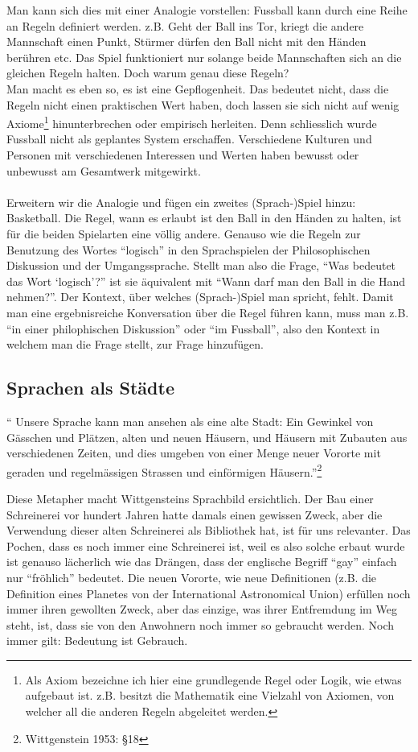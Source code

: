 \documentclass[10pt,a4paper]{article}
\begin{document}
Man kann sich dies mit einer Analogie vorstellen: Fussball kann durch eine Reihe an Regeln definiert werden. z.B. Geht der Ball ins Tor, kriegt die andere Mannschaft einen Punkt, Stürmer dürfen den Ball nicht mit den Händen berühren etc. Das Spiel funktioniert nur solange beide Mannschaften sich an die gleichen Regeln halten. Doch warum genau diese Regeln? \\ 
Man macht es eben so, es ist eine Gepflogenheit. Das bedeutet nicht, dass die Regeln nicht einen praktischen Wert haben, doch lassen sie sich nicht auf wenig Axiome\footnote{Als Axiom bezeichne ich hier eine grundlegende Regel oder Logik, wie etwas aufgebaut ist. z.B. besitzt die Mathematik eine Vielzahl von Axiomen, von welcher all die anderen Regeln abgeleitet werden.} hinunterbrechen oder empirisch herleiten. Denn schliesslich wurde Fussball nicht als geplantes System erschaffen. Verschiedene Kulturen und Personen mit verschiedenen Interessen und Werten haben bewusst oder unbewusst am Gesamtwerk mitgewirkt. \\
\\
Erweitern wir die Analogie und fügen ein zweites (Sprach-)Spiel hinzu: Basketball. Die Regel, wann es erlaubt ist den Ball in den Händen zu halten, ist für die beiden Spielarten eine völlig andere. Genauso wie die Regeln zur Benutzung des Wortes \enquote{logisch} in den Sprachspielen der Philosophischen Diskussion und der Umgangssprache. Stellt man also die Frage, \enquote{Was bedeutet das Wort \enquote{logisch}?} ist sie äquivalent mit \enquote{Wann darf man den Ball in die Hand nehmen?}. Der Kontext, über welches (Sprach-)Spiel man spricht, fehlt. Damit man eine ergebnisreiche Konversation über die Regel führen kann, muss man z.B. \enquote{in einer philophischen Diskussion} oder \enquote{im Fussball}, also den Kontext in welchem man die Frage stellt, zur Frage hinzufügen.

\subsection{Sprachen als Städte}
\begin{displayquote}
\enquote{
Unsere Sprache kann man ansehen als eine alte Stadt: Ein Gewinkel von Gässchen und Plätzen, alten und neuen Häusern, und Häusern mit Zubauten aus verschiedenen Zeiten, und dies umgeben von einer Menge neuer Vororte mit geraden und regelmässigen Strassen und einförmigen Häusern.}\footnote{Wittgenstein 1953: §18}
\end{displayquote}
Diese Metapher macht Wittgensteins Sprachbild ersichtlich. Der Bau einer Schreinerei vor hundert Jahren hatte damals einen gewissen Zweck, aber die Verwendung dieser alten Schreinerei als Bibliothek hat, ist für uns relevanter. Das Pochen, dass es noch immer eine Schreinerei ist, weil es also solche erbaut wurde ist genauso lächerlich wie das Drängen, dass der englische Begriff \enquote{gay} einfach nur \enquote{fröhlich} bedeutet. Die neuen Vororte, wie neue Definitionen (z.B. die Definition eines Planetes von der International Astronomical Union) erfüllen noch immer ihren gewollten Zweck, aber das einzige, was ihrer Entfremdung im Weg steht, ist, dass sie von den Anwohnern noch immer so gebraucht werden. Noch immer gilt: Bedeutung ist Gebrauch.
\end{document}
